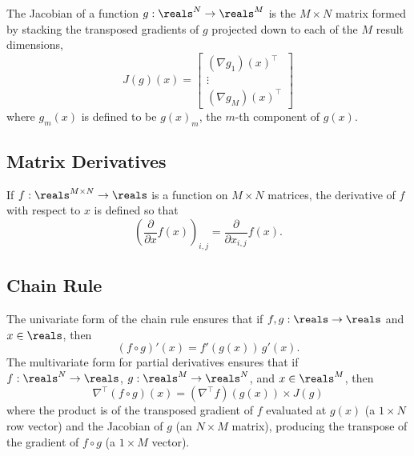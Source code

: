 \documentclass[10pt]{article}
\begin{document}
The Jacobian of a function $g : \reals^N \rightarrow \reals^M$ is 
the $M \times N$ matrix formed by stacking the transposed gradients of $g$ projected down to
each of the $M$ result dimensions,
%
\[
J(g)(x) = 
\left[
\begin{array}{c}
(\nabla g_1)(x)^{\top}
\\[2pt]
\vdots
\\[2pt]
(\nabla g_M)(x)^{\top}
\end{array}
\right]
\]
%
where $g_m(x)$ is defined to be $g(x)_m$, the $m$-th component of $g(x)$.


\subsection{Matrix Derivatives}

If $f:\reals^{M \times N} \rightarrow \reals$ is a function on $M
\times N$ matrices, the derivative of $f$ with respect to $x$ is
defined so that 
\[
\left( \frac{\partial}{\partial x} f(x) \right)_{i,j}
=
\frac{\partial}{\partial x_{i,j}} f(x).
\]

\subsection{Chain Rule}

The univariate form of the chain rule ensures that if $f,g:\reals
\rightarrow \reals$ and $x \in \reals$, then 
\[
(f \circ g)'(x) = f'(g(x)) \, g'(x).
\]
The multivariate form for partial derivatives ensures that if
$f:\reals^N \rightarrow \reals$, $g:\reals^M \rightarrow \reals^N$,
and $x \in \reals^M$, then
\[
\nabla^{\top}\!(f \circ g) (x)
= 
  \left( \nabla^{\top} f \right)\!(g(x))
  \times
  J(g)
\]
where the product is of the transposed gradient of $f$ evaluated at
$g(x)$ (a $1 \times N$ row vector) and the Jacobian of $g$ (an $N
\times M$ matrix), producing the transpose of the gradient of $f \circ
g$ (a $1 \times M$ vector).



\clearpage
\nocite{Hogan:2014}
\nocite{Bell:2012}
\nocite{VandevoordeJosuttis:2002}
\nocite{Giles:2008}
\nocite{Gay:2005}
\nocite{GriewankWalther:2008}
\nocite{Fog:2014}
\nocite{Hogan:2014}
\nocite{Neal:2003}



\end{document}
